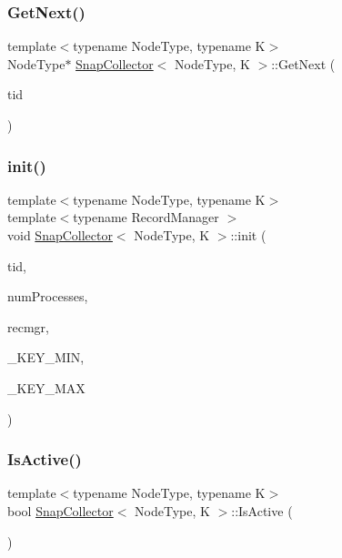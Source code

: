 \subsubsection{\texorpdfstring{Get\+Next()}{GetNext()}}
{\footnotesize\ttfamily template$<$typename Node\+Type, typename K$>$ \\
Node\+Type$\ast$ \hyperlink{classSnapCollector}{Snap\+Collector}$<$ Node\+Type, K $>$\+::Get\+Next (\begin{DoxyParamCaption}\item[{int}]{tid }\end{DoxyParamCaption})\hspace{0.3cm}{\ttfamily [inline]}}

\mbox{\label{classSnapCollector_ab94abbe542a7e33a212e8247b96197b5}} 
\subsubsection{\texorpdfstring{init()}{init()}}
{\footnotesize\ttfamily template$<$typename Node\+Type, typename K$>$ \\
template$<$typename Record\+Manager $>$ \\
void \hyperlink{classSnapCollector}{Snap\+Collector}$<$ Node\+Type, K $>$\+::init (\begin{DoxyParamCaption}\item[{const int}]{tid,  }\item[{const int}]{num\+Processes,  }\item[{Record\+Manager $\ast$const}]{recmgr,  }\item[{const K}]{\+\_\+\+K\+E\+Y\+\_\+\+M\+IN,  }\item[{const K}]{\+\_\+\+K\+E\+Y\+\_\+\+M\+AX }\end{DoxyParamCaption})\hspace{0.3cm}{\ttfamily [inline]}}

\mbox{\label{classSnapCollector_a6140fe1b63009ac107881faaf43c09da}} 
\subsubsection{\texorpdfstring{Is\+Active()}{IsActive()}}
{\footnotesize\ttfamily template$<$typename Node\+Type, typename K$>$ \\
bool \hyperlink{classSnapCollector}{Snap\+Collector}$<$ Node\+Type, K $>$\+::Is\+Active (\begin{DoxyParamCaption}{ }\end{DoxyParamCaption})\hspace{0.3cm}{\ttfamily [inline]}}

